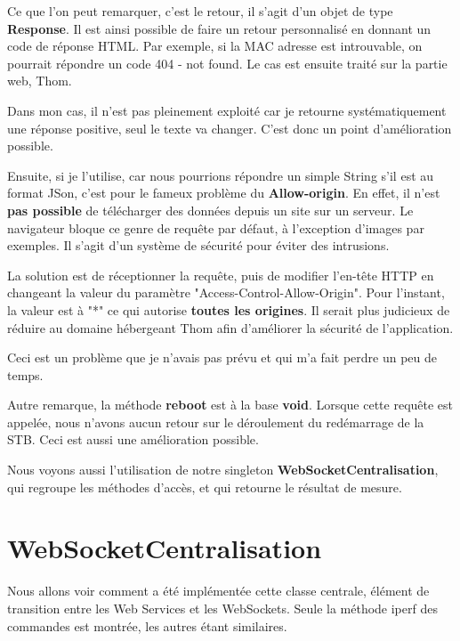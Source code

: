 Ce que l'on peut remarquer, c'est le retour, il s'agit d'un objet de type \textbf{Response}. Il est ainsi possible de faire un retour personnalisé en donnant un code de réponse HTML. Par exemple, si la MAC adresse est introuvable, on pourrait répondre un code 404 - not found. Le cas est ensuite traité sur la partie web, Thom. 

\medskip

Dans mon cas, il n'est pas pleinement exploité car je retourne systématiquement une réponse positive, seul le texte va changer. C'est donc un point d'amélioration possible.

\medskip

Ensuite, si je l'utilise, car nous pourrions répondre un simple String s'il est au format JSon, c'est pour le fameux problème du \textbf{Allow-origin}. En effet, il n'est \textbf{pas possible} de télécharger des données depuis un site sur un serveur. Le navigateur bloque ce genre de requête par défaut, à l'exception d'images par exemples. Il s'agit d'un système de sécurité pour éviter des intrusions.

\medskip

La solution est de réceptionner la requête, puis de modifier l'en-tête HTTP en changeant la valeur du paramètre "Access-Control-Allow-Origin". Pour l'instant, la valeur est à "*" ce qui autorise \textbf{toutes les origines}. Il serait plus judicieux de réduire au domaine hébergeant Thom afin d'améliorer la sécurité de l'application.

\medskip

Ceci est un problème que je n'avais pas prévu et qui m'a fait perdre un peu de temps.

\medskip

Autre remarque, la méthode \textbf{reboot} est à la base \textbf{void}. Lorsque cette requête est appelée, nous n'avons aucun retour sur le déroulement du redémarrage de la STB. Ceci est aussi une amélioration possible.

\medskip

Nous voyons aussi l'utilisation de notre singleton \textbf{WebSocketCentralisation}, qui regroupe les méthodes d'accès, et qui retourne le résultat de mesure.

\section{WebSocketCentralisation}

Nous allons voir comment a été implémentée cette classe centrale, élément de transition entre les Web Services et les WebSockets. Seule la méthode iperf des commandes est montrée, les autres étant similaires.
